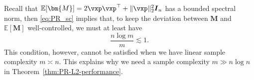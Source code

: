 

Recall that $\mathbb{E}[\bm{M}] = 2 \vxp \vxp^\top +  \| \vxp\|_2^2 \boldsymbol{I}_n$ has a bounded spectral norm, then \eqref{eq:PR_sc} implies that, to keep the deviation between $\bm{M}$ and $\mathbb{E}[\bm{M}]$ well-controlled, we must at least have
\[
\frac{n \log m}{ m} \lesssim 1.
\]
This condition, however, cannot be satisfied when we have linear sample complexity $m \asymp  n$. This explains why we need a sample complexity $m \gg n \log n$ in Theorem~\ref{thm:PR-L2-performance}. 

